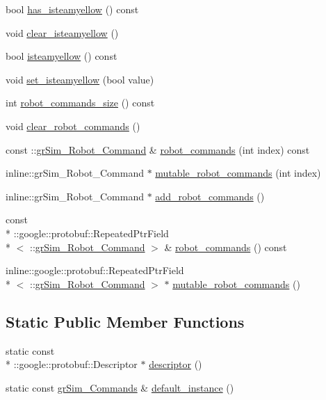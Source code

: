 \begin{DoxyCompactItemize}
\item 
bool \hyperlink{classgr_sim___commands_aaa2ff87f1d74235838c70e67916dc2ab}{has\-\_\-isteamyellow} () const 
\item 
void \hyperlink{classgr_sim___commands_a19c41f4f96afdb8dcb6223e24094c745}{clear\-\_\-isteamyellow} ()
\item 
bool \hyperlink{classgr_sim___commands_a140be0183a19b01a14e87462b800d1d1}{isteamyellow} () const 
\item 
void \hyperlink{classgr_sim___commands_a618af41b1713fb49e1f5efeae890431d}{set\-\_\-isteamyellow} (bool value)
\item 
int \hyperlink{classgr_sim___commands_a8f37baa92a87f9d6ae305e318e50641c}{robot\-\_\-commands\-\_\-size} () const 
\item 
void \hyperlink{classgr_sim___commands_adc1279f05841e161032ff1bea37e65b0}{clear\-\_\-robot\-\_\-commands} ()
\item 
const \-::\hyperlink{classgr_sim___robot___command}{gr\-Sim\-\_\-\-Robot\-\_\-\-Command} \& \hyperlink{classgr_sim___commands_aa74fbbced0985136e665d3afe804140b}{robot\-\_\-commands} (int index) const 
\item 
inline\-::gr\-Sim\-\_\-\-Robot\-\_\-\-Command $\ast$ \hyperlink{classgr_sim___commands_ae4d8be3daacd96e43032f7d020ae9f8a}{mutable\-\_\-robot\-\_\-commands} (int index)
\item 
inline\-::gr\-Sim\-\_\-\-Robot\-\_\-\-Command $\ast$ \hyperlink{classgr_sim___commands_ab10b545c6be5fbed08a1b0a8d567f18f}{add\-\_\-robot\-\_\-commands} ()
\item 
const \\*
\-::google\-::protobuf\-::\-Repeated\-Ptr\-Field\\*
$<$ \-::\hyperlink{classgr_sim___robot___command}{gr\-Sim\-\_\-\-Robot\-\_\-\-Command} $>$ \& \hyperlink{classgr_sim___commands_a169443838efbf7a1ec780fb3300c8eee}{robot\-\_\-commands} () const 
\item 
inline\-::google\-::protobuf\-::\-Repeated\-Ptr\-Field\\*
$<$ \-::\hyperlink{classgr_sim___robot___command}{gr\-Sim\-\_\-\-Robot\-\_\-\-Command} $>$ $\ast$ \hyperlink{classgr_sim___commands_ad328b46a45567b043cb657236a91908d}{mutable\-\_\-robot\-\_\-commands} ()
\end{DoxyCompactItemize}
\subsection*{Static Public Member Functions}
\begin{DoxyCompactItemize}
\item 
static const \\*
\-::google\-::protobuf\-::\-Descriptor $\ast$ \hyperlink{classgr_sim___commands_a74fcf61ccaec1e77e375905d8a4f6bb8}{descriptor} ()
\item 
static const \hyperlink{classgr_sim___commands}{gr\-Sim\-\_\-\-Commands} \& \hyperlink{classgr_sim___commands_a38acab0970e076b98c946ef2382542f6}{default\-\_\-instance} ()
\end{DoxyCompactItemize}
